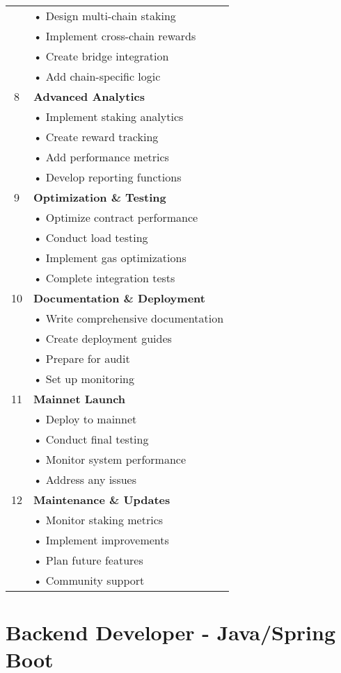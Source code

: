 \documentclass{article}
\begin{document}
\begin{longtable}{|c|p{}|}
& • Design multi-chain staking\\
& • Implement cross-chain rewards\\
& • Create bridge integration\\
& • Add chain-specific logic\\
\hline
8 & \textbf{Advanced Analytics}\\
& • Implement staking analytics\\
& • Create reward tracking\\
& • Add performance metrics\\
& • Develop reporting functions\\
\hline
9 & \textbf{Optimization \& Testing}\\
& • Optimize contract performance\\
& • Conduct load testing\\
& • Implement gas optimizations\\
& • Complete integration tests\\
\hline
10 & \textbf{Documentation \& Deployment}\\
& • Write comprehensive documentation\\
& • Create deployment guides\\
& • Prepare for audit\\
& • Set up monitoring\\
\hline
11 & \textbf{Mainnet Launch}\\
& • Deploy to mainnet\\
& • Conduct final testing\\
& • Monitor system performance\\
& • Address any issues\\
\hline
12 & \textbf{Maintenance \& Updates}\\
& • Monitor staking metrics\\
& • Implement improvements\\
& • Plan future features\\
& • Community support\\
\hline
\end{longtable}

\section*{Backend Developer - Java/Spring Boot}
\end{document}

